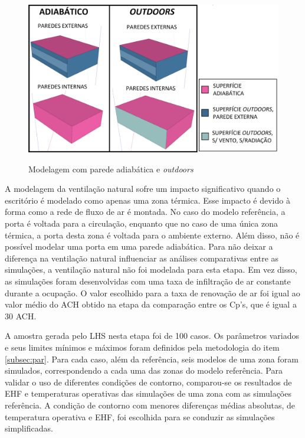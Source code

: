 \documentclass[brazil,hardcopy,openany,a5paper]{ufscthesis}
\begin{document}
		\begin{figure}[h]
			\centering
			\caption{Modelagem com parede adiabática e \textit{outdoors}}
			\includegraphics[width=1\linewidth]{img/adiabatic_outdoors.png}
			\label{fig:adiabatic_outdoors}
		\end{figure}
	
		
		A modelagem da ventilação natural sofre um impacto significativo quando o escritório é modelado como apenas uma zona térmica.
		Esse impacto é devido à forma como a rede de fluxo de ar é montada. No caso do modelo referência, a porta é voltada para a circulação, enquanto que no caso de uma única zona térmica, a porta desta zona é voltada para o ambiente externo. 
		Além disso, não é possível modelar uma porta em uma parede adiabática. Para não deixar a diferença na ventilação natural influenciar as análises comparativas entre as simulações, a ventilação natural não foi modelada para esta etapa.
		Em vez disso, as simulações foram desenvolvidas com uma taxa de infiltração de ar constante durante a ocupação. O valor escolhido para a taxa de renovação de ar foi igual ao valor médio do ACH obtido na etapa da comparação entre os Cp's, que é igual a 30 ACH.
		
		A amostra gerada pelo LHS nesta etapa foi de 100 casos.
		Os parâmetros variados e seus limites mínimos e máximos foram definidos pela metodologia do item \ref{subsec:par}.
		Para cada caso, além da referência, seis modelos de uma zona foram simulados, correspondendo a cada uma das zonas do modelo referência.
		Para validar o uso de diferentes condições de contorno, comparou-se os resultados de EHF e temperaturas operativas das simulações de uma zona com as simulações referência.
		A condição de contorno com menores diferenças médias absolutas, de temperatura operativa e EHF, foi escolhida para se conduzir as simulações simplificadas.
		
\end{document}
